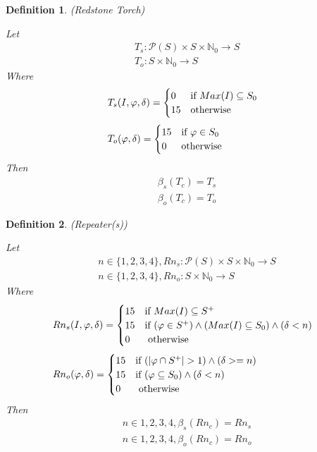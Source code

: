 \documentclass{article}
\newtheorem{defn}{Definition}[section]
\begin{document}
\begin{defn} (Redstone Torch)

	Let
	\begin{align}
		& T_{s} : \mathcal{P}(S) \times S \times \mathbb{N}_{0} \rightarrow S \\
		& T_{o} : S \times \mathbb{N}_{0} \rightarrow S
	\end{align}
	Where
	\begin{align}
		& T_{s}(I, \varphi, \delta) =
		\begin{cases}
			0 & \text{if } Max(I) \subseteq S_{0} \\
			15 & \text{otherwise}
		\end{cases} \\[\jot]
		& T_{o}(\varphi, \delta) =
		\begin{cases}
			15 & \text{if } \varphi \in S_{0} \\
			0 & \text{otherwise}
		\end{cases}
	\end{align}
	Then
	\begin{align}
		& \beta_{s}(T_{c}) = T_{s} \\
		& \beta_{o}(T_{c}) = T_{o}
	\end{align}
\end{defn}

\begin{defn} (Repeater(s))
	
	Let
	\begin{align}
		& n \in \{1, 2, 3, 4\}, Rn_{s} : \mathcal{P} (S) \times S \times \mathbb{N}_{0} \rightarrow S \\
		& n \in \{1, 2, 3, 4\}, Rn_{o} : S \times \mathbb{N}_{0} \rightarrow S
	\end{align}
	Where
	\begin{align}
		& Rn_{s}(I, \varphi, \delta) = 
		\begin{cases}
			15 & \text{if } Max(I) \subseteq S^+\\
			15 & \text{if } (\varphi \in S^+) \land (Max(I) \subseteq S_{0}) \land (\delta < n) \\
			0 & \text{ otherwise }
		\end{cases} \\[\jot]
		& Rn_{o}(\varphi, \delta) = 
		\begin{cases}
			15 & \text{if } (|\varphi \cap S^+| > 1) \land (\delta >= n) \\
			15 & \text{if } (\varphi \subseteq S_{0}) \land (\delta < n) \\
			0 & \text{ otherwise }
			\end{cases}
	\end{align}
	Then
	\begin{align}
			& n \in {1, 2, 3, 4}, \beta_{s}(Rn_{c}) = Rn_{s} \\
			& n \in {1, 2, 3, 4}, \beta_{o}(Rn_{c}) = Rn_{o}
	\end{align}
\end{defn}
\end{document}
